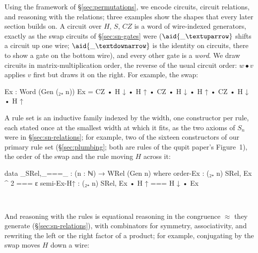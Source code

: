Using the framework of \S\ref{sec:permutations}, we encode circuits,
circuit relations, and reasoning with the relations; three examples
show the shapes that every later section builds on.  A circuit over
$H$, $S$, $CZ$ is a word of wire-indexed generators, exactly as the
swap circuits of \S\ref{sec:sn-gates} were ($\aid{{\_}↑}$ shifts a
circuit up one wire; $\aid{{\_}↓}$ is the identity on circuits, there
to show a gate on the bottom wire), and every other gate is a
\emph{word}.  We draw circuits in matrix-multiplication order, the
reverse of the usual circuit order: $w \bullet v$ applies $v$ first
but draws it on the right.  For example, the swap:

\noindent\begin{minipage}[c]{0.56\textwidth}
\begin{code}
Ex : Word (Gen (₂₊ n))
Ex = CZ • H ↓ • H ↑ • CZ • H ↓ • H ↑ • CZ • H ↓ • H ↑
\end{code}
\end{minipage}\hfill
\begin{minipage}[c]{0.42\textwidth}\centering
{}
\end{minipage}

\noindent A rule set is an inductive family indexed by the width, one
constructor per rule, each stated once at the smallest width at which
it fits, as the two axioms of $S_n$ were in \S\ref{sec:sn-relations};
for example, two of the sixteen constructors of our primary rule set
 (\S\ref{sec:plumbing}; both are rules of
the qupit paper's Figure~1), the order of the swap and the rule moving
$H$ across it:

\noindent\begin{minipage}[c]{0.56\textwidth}
\begin{code}
data _SRel,_===_ : (n : ℕ) → WRel (Gen n) where
  order-Ex    : (₂₊ n) SRel,  Ex ^ 2 === ε
  semi-Ex-H↑  : (₂₊ n) SRel,  Ex • H ↑ === H ↓ • Ex
\end{code}
\end{minipage}\hfill
\begin{minipage}[c]{0.42\textwidth}\centering
{}\\[3pt]
\end{minipage}

\noindent And reasoning with the rules is equational reasoning in the
congruence $\approx$ they generate (\S\ref{sec:sn-relations}), with
combinators for symmetry, associativity, and rewriting the left or the
right factor of a product; for example, conjugating by the swap moves
$H$ down a wire:

